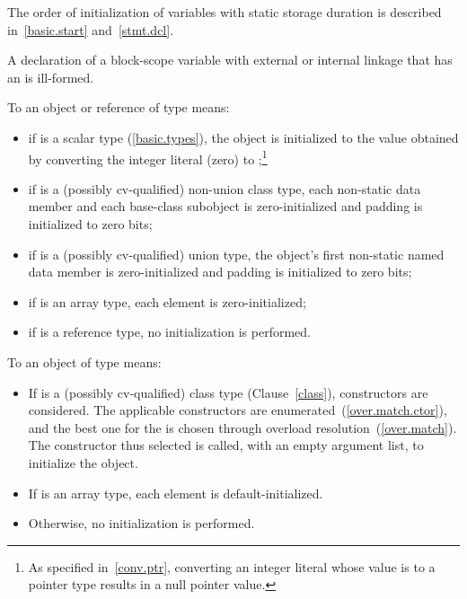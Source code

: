 \pnum
The order of initialization of variables with static storage duration is described in~\ref{basic.start}
and~\ref{stmt.dcl}.
\exitnote

\pnum
A declaration of a block-scope variable with external or internal
linkage that has an  is ill-formed.

\pnum
{}%
%
%
%
To
an object or reference of type
means:

\begin{itemize}
\item
if
is a scalar type (\ref{basic.types}), the
object
is initialized to the value obtained by converting the integer literal 
(zero) to
;\footnote{As specified in~\ref{conv.ptr}, converting an integer
literal whose value is
to a pointer type results in a null pointer value.
}

\item
if
is a (possibly cv-qualified) non-union class type,
each non-static data member and each
base-class subobject is zero-initialized and padding is initialized to zero bits;

\item
if
is a (possibly cv-qualified) union type,
the
object's first non-static named
data member
is zero-initialized and padding is initialized to zero bits;

\item
if
is an array type,
each element is zero-initialized;
\item
if
is a reference type, no initialization is performed.
\end{itemize}

\pnum
{}%
To
an object of type
means:

\begin{itemize}
\item
If
is a (possibly cv-qualified) class type (Clause~\ref{class}),
constructors are considered. The applicable constructors are
enumerated~(\ref{over.match.ctor}), and the best one for the
 \tcode{()} is chosen through
overload resolution~(\ref{over.match}). The constructor thus selected
is called, with an empty argument list, to initialize the object.

\item
If
is an array type, each element is default-initialized.

\item
Otherwise,
no initialization is performed.
\end{itemize}

